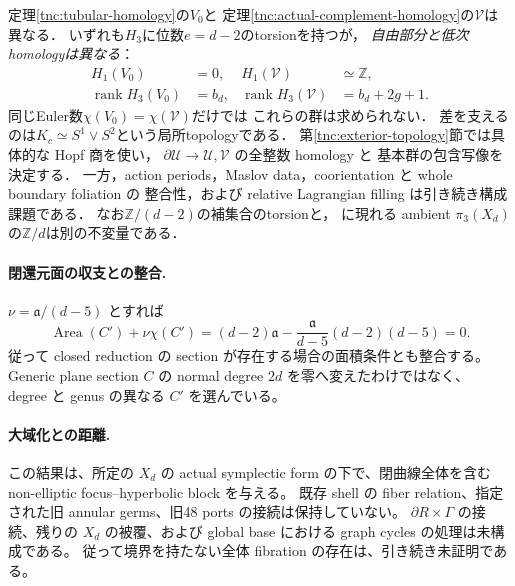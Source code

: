 \begin{remark}
\label{tnc:complement-distinction}
定理\ref{tnc:tubular-homology}の$V_0$と
定理\ref{tnc:actual-complement-homology}の$\mathcal V$は異なる．
いずれも$H_3$に位数$e=d-2$のtorsionを持つが，
\emph{自由部分と低次homologyは異なる}：
\[
 \begin{aligned}
 H_1(V_0)&=0,& H_1(\mathcal V)&\simeq\mathbb Z,\\
 \operatorname{rank}H_3(V_0)&=b_d,&
 \operatorname{rank}H_3(\mathcal V)&=b_d+2g+1 .
 \end{aligned}
\]
同じEuler数$\chi(V_0)=\chi(\mathcal V)$だけでは
これらの群は求められない．
差を支えるのは$K_c\simeq S^1\vee S^2$という局所topologyである．
第\ref{tnc:exterior-topology}節では具体的な Hopf 商を使い，
$\partial\mathcal U\to\mathcal U,\mathcal V$ の全整数 homology と
基本群の包含写像を決定する．
一方，action periods，Maslov data，coorientation と whole boundary foliation の
整合性，および relative Lagrangian filling は引き続き構成課題である．
なお$\mathbb Z/(d-2)$の補集合のtorsionと，
\cite[\S2.1]{randal-williams-hypersurface}に現れる
ambient $\pi_3(X_d)$の$\mathbb Z/d$は別の不変量である．
\end{remark}

\paragraph{閉還元面の収支との整合.}
$\nu=\mathfrak a/(d-5)$ とすれば
\[
 \operatorname{Area}(C')+\nu\chi(C')
 =(d-2)\mathfrak a-\frac{\mathfrak a}{d-5}(d-2)(d-5)=0.
\]
従って closed reduction の section が存在する場合の面積条件とも整合する。
Generic plane section $C$ の normal degree $2d$ を零へ変えたわけではなく、
degree と genus の異なる $C'$ を選んでいる。

\paragraph{大域化との距離.}
この結果は、所定の $X_d$ の actual symplectic form の下で、閉曲線全体を含む
non-elliptic focus--hyperbolic block を与える。
既存 shell の fiber relation、指定された旧 annular germs、旧48 ports の接続は保持していない。
$\partial R\times\Gamma$ の接続、残りの $X_d$ の被覆、および global base における graph cycles の処理は未構成である。
従って境界を持たない全体 fibration の存在は、引き続き未証明である。

